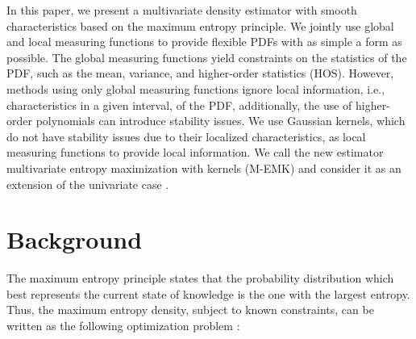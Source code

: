 \documentclass[conference]{IEEEtran}
\begin{document}
In this paper, we present a multivariate density estimator with smooth characteristics based on the maximum entropy principle. We jointly use global and local measuring functions to provide flexible PDFs with as simple a form as possible. The global measuring functions yield constraints on the statistics of the PDF, such as the mean, variance, and higher-order statistics (HOS). However, methods using only global measuring functions ignore local information, i.e., characteristics in a given interval, of the PDF, additionally, the use of higher-order polynomials can introduce stability issues. We use Gaussian kernels, which do not have stability issues due to their localized characteristics, as local measuring functions to provide local information. We call the new estimator multivariate entropy maximization with kernels (M-EMK) and consider it as an extension of the univariate case \cite{Zois:2015}.
	
%
	
\section{ Background }
\label{sec:sys_model}
The maximum entropy principle states that the probability distribution which best represents the current state of knowledge is the one with the largest entropy. Thus, the maximum entropy density, subject to known constraints, can be written as the following optimization problem \cite{Cover2006}:
%
\end{document}
